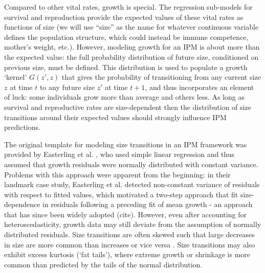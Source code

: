 \documentclass[11pt]{article}
\begin{document}
{Compared to other vital rates, growth is special. 
The regression sub-models for survival and reproduction provide the expected values of these vital rates as functions of size (we will use ``size'' as the name
for whatever continuous variable defines the population structure, which could instead be immune competence, mother's weight, etc.).   
However, modeling growth for an IPM is about more than the expected value: the full probability distribution of future size, conditioned on previous size, must be defined. 
This distribution is used to populate a growth `kernel' $G(z',z)$ that gives the probability of transitioning from any current size $z$ at time $t$ to any future size $z'$ at time $t+1$, and thus incorporates an element of luck: some individuals grow more than average and others less.
As long as survival and reproductive rates are size-dependent then the distribution of size transitions around their expected values should strongly influence IPM predictions. 

The original template for modeling size transitions in an IPM framework was provided by Easterling et al. \citeyear{easterling2000size}, who used simple linear regression and thus assumed that growth residuals were normally distributed with constant variance. 
Problems with this approach were apparent from the beginning: in their landmark case study, Easterling et al. detected non-constant variance of residuals with respect to fitted values, which motivated a two-step approach that fit size-dependence in residuals following a preceding fit of mean growth - an approach that has since been widely adopted (cite). 
However, even after accounting for heteroscedasticity, growth data may still deviate from the assumption of normally distributed residuals. 
Size transitions are often skewed such that large decreases in size are more common than increases \citep{peterson2019improving,salguero2010keeping} or vice versa \citep{stubberud2019effects}.
Size transitions may also exhibit excess kurtosis (`fat tails'), where extreme growth or shrinkage is more common than predicted by the tails of the normal distribution. 

}
\end{document}
